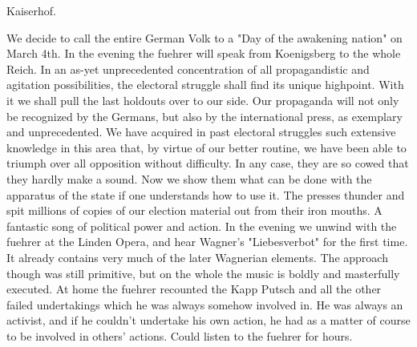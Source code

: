 Kaiserhof.

We decide to call the entire German Volk to a "Day of the awakening nation" on March 4th. In the evening the fuehrer will speak from Koenigsberg to the whole Reich. In an as-yet unprecedented concentration of all propagandistic and agitation possibilities, the electoral struggle shall find its unique highpoint. With it we shall pull the last holdouts over to our side. Our propaganda will not only be recognized by the Germans, but also by the international press, as exemplary and unprecedented. We have acquired in past electoral struggles such extensive knowledge in this area that, by virtue of our better routine, we have been able to triumph over all opposition without difficulty. In any case, they are so cowed that they hardly make a sound. Now we show them what can be done with the apparatus of the state if one understands how to use it. The presses thunder and spit millions of copies of our election material out from their iron mouths. A fantastic song of political power and action. In the evening we unwind with the fuehrer at the Linden Opera, and hear Wagner's "Liebesverbot" for the first time. It already contains very much of the later Wagnerian elements. The approach though was still primitive, but on the whole the music is boldly and masterfully executed. At home the fuehrer recounted the Kapp Putsch and all the other failed undertakings which he was always somehow involved in. He was always an activist, and if he couldn't undertake his own action, he had as a matter of course to be involved in others' actions. Could listen to the fuehrer for hours.


